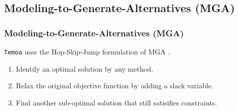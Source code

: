 \subsection{Modeling-to-Generate-Alternatives (MGA)}
\begin{frame}
  \frametitle{Modeling-to-Generate-Alternatives (MGA)}
  \texttt{Temoa} uses the Hop-Skip-Jump formulation of MGA \cite{brill_modeling_1982}.
  \begin{enumerate}
    \item Identify an optimal solution by any method.
    \item Relax the original objective function by adding a slack variable.
    \item Find another sub-optimal solution that still satisifies constraints.
  \end{enumerate}
\end{frame}
